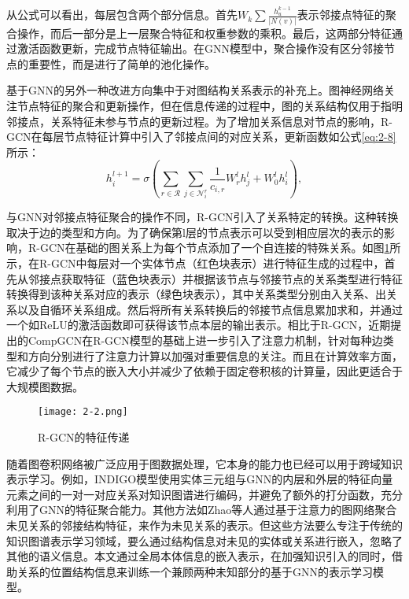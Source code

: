 从公式可以看出，每层包含两个部分信息。首先\(W_{k}\sum\frac{h^{k-1}_{u}}{|N(v)|}\)表示邻接点特征的聚合操作，而后一部分是上一层聚合特征和权重参数的乘积。最后，这两部分特征通过激活函数更新，完成节点特征输出。在GNN模型中，聚合操作没有区分邻接节点的重要性，而是进行了简单的池化操作。

基于GNN的另外一种改进方向集中于对图结构关系表示的补充上。图神经网络关注节点特征的聚合和更新操作，但在信息传递的过程中，图的关系结构仅用于指明邻接点，关系特征未参与节点的更新过程。为了增加关系信息对节点的影响，R-GCN在每层节点特征计算中引入了邻接点间的对应关系，更新函数如公式\ref{eq:2-8}所示：
\begin{equation}
  h_{i}^{l+1} = \sigma \left( \sum_{r\in\mathcal{R}} \sum_{j\in\mathcal{N}_{i}^{r}} \frac{1}{c_{i,r}}W_{r}^{l}h_{j}^{l} + W_{0}^{l}h_{i}^{l}\right), \label{eq:2-8}
\end{equation}

与GNN对邻接点特征聚合的操作不同，R-GCN引入了关系特定的转换。这种转换取决于边的类型和方向。为了确保第l层的节点表示可以受到相应层次的表示的影响，R-GCN在基础的图关系上为每个节点添加了一个自连接的特殊关系。如图\ref{fig:2-2}所示，在R-GCN中每层对一个实体节点（红色块表示）进行特征生成的过程中，首先从邻接点获取特征（蓝色块表示）并根据该节点与邻接节点的关系类型进行特征转换得到该种关系对应的表示（绿色块表示），其中关系类型分别由入关系、出关系以及自循环关系组成。然后将所有关系转换后的邻接节点信息累加求和，并通过一个如ReLU的激活函数即可获得该节点本层的输出表示。相比于R-GCN，近期提出的CompGCN在R-GCN模型的基础上进一步引入了注意力机制，针对每种边类型和方向分别进行了注意力计算以加强对重要信息的关注。而且在计算效率方面，它减少了每个节点的嵌入大小并减少了依赖于固定卷积核的计算量，因此更适合于大规模图数据。
\begin{figure}[h]
  \centering
  \texttt{[image: 2-2.png]}
  \caption{R-GCN的特征传递}
  \label{fig:2-2}
\end{figure}

随着图卷积网络被广泛应用于图数据处理，它本身的能力也已经可以用于跨域知识表示学习。例如，INDIGO\cite{liu2021indigo}模型使用实体三元组与GNN的内层和外层的特征向量元素之间的一对一对应关系对知识图谱进行编码，并避免了额外的打分函数，充分利用了GNN的特征聚合能力。其他方法如Zhao\cite{zhao2020attention}等人通过基于注意力的图网络聚合未见关系的邻接结构特征，来作为未见关系的表示。但这些方法要么专注于传统的知识图谱表示学习领域，要么通过结构信息对未见的实体或关系进行嵌入，忽略了其他的语义信息。本文通过全局本体信息的嵌入表示，在加强知识引入的同时，借助关系的位置结构信息来训练一个兼顾两种未知部分的基于GNN的表示学习模型。

